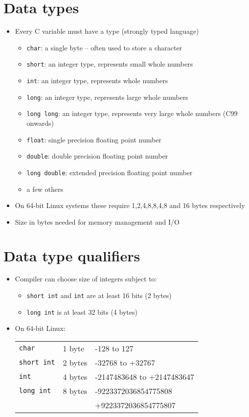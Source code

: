 \documentclass{article}
\begin{document}
\section{Data types}
\begin{itemize}
\item Every C variable must have a type (strongly typed language) 

\begin{itemize}
\item \verb!char!: a single byte -- often used to store a character
\item \verb!short!: an integer type, represents small whole numbers
\item \verb!int!: an integer type, represents whole numbers
\item \verb!long!: an integer type, represents large whole numbers
\item \verb!long long!: an integer type, represents very large whole numbers (C99 onwards)
\item \verb!float!: single precision floating point number
\item \verb!double!: double precision floating point number
\item \verb!long double!: extended precision floating point number
\item a few others 
\end{itemize}

\item On 64-bit Linux systems these require 1,2,4,8,8,4,8 and 16 bytes respectively
\item Size in bytes needed for memory management and I/O
\end{itemize}



\section{Data type qualifiers}
\begin{itemize}
\item Compiler can choose size of integers subject to:
\begin{itemize}
\item \verb!short int! and \verb!int! are at least 16 bits (2 bytes)
\item \verb!long int! is at least 32 bits (4 bytes)
\end{itemize}
\item On 64-bit Linux:
\begin{tabular}{lll}
\verb!char! & 1 byte & -128 to 127\\
\verb!short int! & 2 bytes & -32768 to +32767\\
\verb!int! & 4 bytes & -2147483648 to +2147483647\\
\verb!long int! & 8 bytes & -9223372036854775808\\
& & +9223372036854775807
\end{tabular}
\end{itemize}
\end{document}
